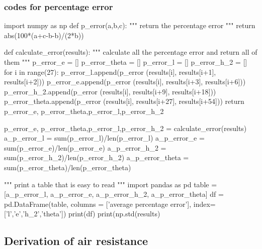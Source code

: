 \documentclass{article}
\begin{document}
    \subsubsection{codes for percentage error}\label{ap:p_error}
\begin{python}
import numpy as np
def p_error(a,b,c):
    """
    return the percentage error
    """
    return abs(100*(a+c-b-b)/(2*b))

def calculate_error(results):
    """
    calculate all the percentage error
    and return all of them
    """
    p_error_e = []
    p_error_theta = []
    p_error_l = []
    p_error_h_2 = []
    for i in range(27):
        p_error_l.append(p_error
                        (results[i],
                        results[i+1],
                        results[i+2]))
        p_error_e.append(p_error
                        (results[i],
                        results[i+3],
                        results[i+6]))
        p_error_h_2.append(p_error
                        (results[i],
                            results[i+9],
                            results[i+18]))
        p_error_theta.append(p_error
                            (results[i],
                            results[i+27],
                            results[i+54]))
    return p_error_e, p_error_theta,p_error_l,p_error_h_2




p_error_e, p_error_theta,p_error_l,p_error_h_2 = calculate_error(results)
a_p_error_l = sum(p_error_l)/len(p_error_l)
a_p_error_e = sum(p_error_e)/len(p_error_e)
a_p_error_h_2 = sum(p_error_h_2)/len(p_error_h_2)
a_p_error_theta = sum(p_error_theta)/len(p_error_theta)

"""
print a table
that is easy to read
"""
import pandas as pd
table = [a_p_error_l,
         a_p_error_e,
         a_p_error_h_2, 
         a_p_error_theta]
df = pd.DataFrame(table, 
                  columns = ['average percentage error'], 
                  index=['l','e','h_2','theta'])
print(df)
print(np.std(results)
    
    \end{python}
    \subsection{Derivation of air resistance}\label{derviair}
\end{document}
